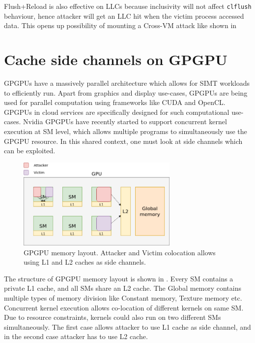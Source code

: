 Flush+Reload is also effective on LLCs because inclusivity will not affect \texttt{clflush} behaviour, hence
attacker will get an LLC hit when the victim process accessed data. This opens up possibility of mounting a Cross-VM 
attack  like shown in 

\section{Cache side channels on GPGPU}

GPGPUs have a massively parallel architecture which allows for SIMT workloads to efficiently run.
Apart from graphics and display use-cases, GPGPUs are being used for parallel computation using
frameworks like CUDA and OpenCL. GPGPUs in cloud services are specifically designed for such computational
use-cases. Nvidia GPGPUs have recently started to support concurrent kernel execution at SM level,
which allows multiple programs to simultaneously use the GPGPU resource. In this shared context,
one must look at side channels which can be exploited.

\begin{figure}[h]
\centering
\includegraphics[width=0.7\textwidth]{gpgpu}
\caption[Memory layout of GPGPU]{GPGPU memory layout. Attacker and Victim colocation allows using L1 and L2 caches as side channels.}
\label{fig:gpgpu}
\end{figure}

The structure of GPGPU memory layout is shown in . Every SM contains a private L1 cache,
and all SMs share an L2 cache. The Global memory contains multiple types of memory division like Constant memory,
Texture memory etc. Concurrent kernel execution allows co-location of different kernels on same SM. Due to resource
constraints, kernels could also run on two different SMs simultaneously. The first case allows attacker to
use L1 cache as side channel, and in the second case attacker has to use L2 cache.

